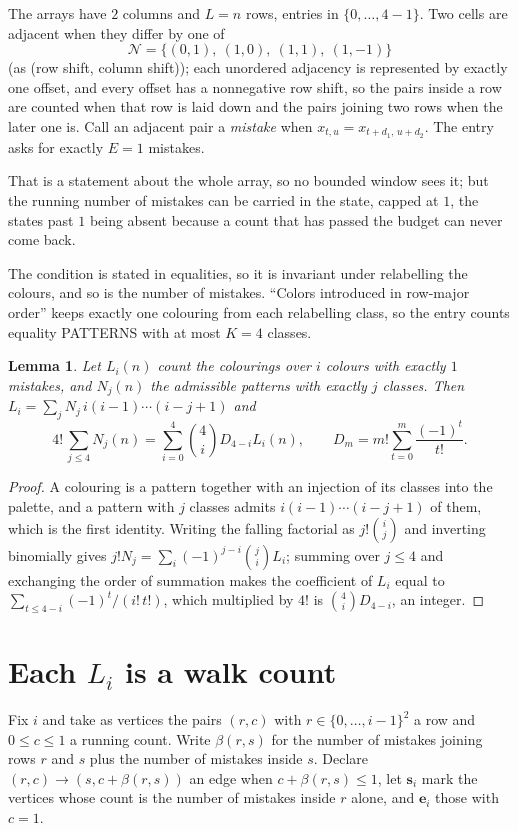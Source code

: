 \documentclass[11pt,a4paper]{article}
\theoremstyle{plain}
\newtheorem{lemma}[theorem]{Lemma}
\theoremstyle{definition}
\begin{document}
The arrays have $2$ columns and $L=n$ rows, entries in $\{0,\dots,4-1\}$.
Two cells are adjacent when they differ by one of
\[
\mathcal N=\{(0,1),\ (1,0),\ (1,1),\ (1,-1)\}
\]
(as (row shift, column shift)); each unordered adjacency is represented by exactly one
offset, and every offset has a nonnegative row shift, so the pairs inside a row are
counted when that row is laid down and the pairs joining two rows when the later one
is. Call an adjacent pair a \emph{mistake} when $x_{t,u}=x_{t+d_1,\,u+d_2}$. The entry asks for exactly
$E=1$ mistakes.

That is a statement about the whole array, so no bounded window sees it; but the running
number of mistakes can be carried in the state, capped at $1$, the states past $1$ being
absent because a count that has passed the budget can never come back.

The condition is stated in equalities, so it is invariant under relabelling the colours, and
so is the number of mistakes. ``Colors introduced in row-major order'' keeps exactly one
colouring from each relabelling class, so the entry counts equality PATTERNS with at most
$K=4$ classes.

\begin{lemma}\label{lem:inv}
Let $L_i(n)$ count the colourings over $i$ colours with exactly $1$ mistakes, and $N_j(n)$
the admissible patterns with exactly $j$ classes. Then
$L_i=\sum_j N_j\,i(i-1)\cdots(i-j+1)$ and
\[
4!\,\sum_{j\le4}N_j(n)=\sum_{i=0}^{4}\binom{4}{i}D_{4-i}L_i(n),
\qquad D_m=m!\sum_{t=0}^{m}\frac{(-1)^t}{t!} .
\]
\end{lemma}

\begin{proof}
A colouring is a pattern together with an injection of its classes into the palette, and a
pattern with $j$ classes admits $i(i-1)\cdots(i-j+1)$ of them, which is the first identity.
Writing the falling factorial as $j!\binom{i}{j}$ and inverting binomially gives
$j!N_j=\sum_i(-1)^{j-i}\binom{j}{i}L_i$; summing over $j\le4$ and exchanging the order
of summation makes the coefficient of $L_i$ equal to $\sum_{t\le4-i}(-1)^t/(i!\,t!)$,
which multiplied by $4!$ is $\binom{4}{i}D_{4-i}$, an integer.
\end{proof}

\section{Each $L_i$ is a walk count}

Fix $i$ and take as vertices the pairs $(r,c)$ with $r\in\{0,\dots,i-1\}^{2}$ a row
and $0\le c\le1$ a running count. Write $\beta(r,s)$ for the number of mistakes joining
rows $r$ and $s$ plus the number of mistakes inside $s$. Declare $(r,c)\to(s,c+\beta(r,s))$
an edge when $c+\beta(r,s)\le1$, let $\mathbf{s}_i$ mark the vertices whose count is the
number of mistakes inside $r$ alone, and $\mathbf{e}_i$ those with $c=1$.
\end{document}
